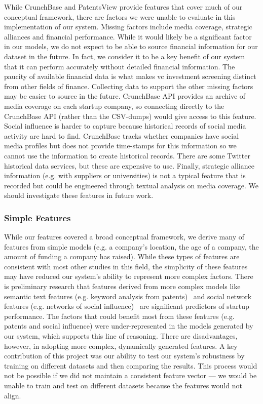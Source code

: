 \documentclass[../thesis/thesis.tex]{subfiles}
\begin{document}
While CrunchBase and PatentsView provide features that cover much of our conceptual framework, there are factors we were unable to evaluate in this implementation of our system. Missing factors include media coverage, strategic alliances and financial performance. While it would likely be a significant factor in our models, we do not expect to be able to source financial information for our dataset in the future. In fact, we consider it to be a key benefit of our system that it can perform accurately without detailed financial information. The paucity of available financial data is what makes \gls{vc} investment screening distinct from other fields of finance. Collecting data to support the other missing factors may be easier to source in the future. CrunchBase API provides an archive of media coverage on each startup company, so connecting directly to the CrunchBase API (rather than the CSV-dumps) would give access to this feature. Social influence is harder to capture because historical records of social media activity are hard to find. CrunchBase tracks whether companies have social media profiles but does not provide time-stamps for this information so we cannot use the information to create historical records. There are some Twitter historical data services, but these are expensive to use. Finally, strategic alliance information (e.g. with suppliers or universities) is not a typical feature that is recorded but could be engineered through textual analysis on media coverage. We should investigate these features in future work.

\subsubsection{Simple Features}

While our features covered a broad conceptual framework, we derive many of features from simple models (e.g. a company's location, the age of a company, the amount of funding a company has raised). While these types of features are consistent with most other studies in this field, the simplicity of these features may have reduced our system's ability to represent more complex factors. There is preliminary research that features derived from more complex models like semantic text features (e.g. keyword analysis from patents)~\cite{hoenen2014,yuan2016} and social network features (e.g. networks of social influence)~\cite{werth2013,yu2015,cheng2016} are significant predictors of startup performance. The factors that could benefit most from these features (e.g. patents and social influence) were under-represented in the models generated by our system, which supports this line of reasoning. There are disadvantages, however, in adopting more complex, dynamically generated features. A key contribution of this project was our ability to test our system's robustness by training on different datasets and then comparing the results. This process would not be possible if we did not maintain a consistent feature vector --- we would be unable to train and test on different datasets because the features would not align.
\end{document}
